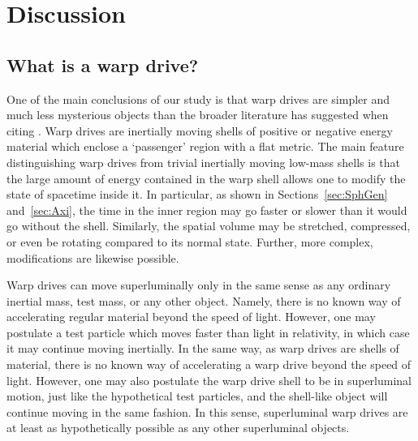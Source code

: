 \documentclass[10pt]{iopart}
\begin{document}






\section{Discussion}
\label{sec:Disc}

\subsection{What is a warp drive?}

One of the main conclusions of our study is that warp drives are simpler and much less mysterious objects than the broader literature has suggested when citing \cite{Alcubierre1994}. Warp drives are inertially moving shells of positive or negative energy material which enclose a `passenger' region with a flat metric. The main feature distinguishing warp drives from trivial inertially moving low-mass shells is that the large amount of energy contained in the warp shell allows one to modify the state of spacetime inside it. In particular, as shown in Sections~\ref{sec:SphGen} and~\ref{sec:Axi}, the time in the inner region may go faster or slower than it would go without the shell. Similarly, the spatial volume may be stretched, compressed, or even be rotating compared to its normal state. Further, more complex, modifications are likewise possible.

Warp drives can move superluminally only in the same sense as any ordinary inertial mass, test mass, or any other object. Namely, there is no known way of accelerating regular material beyond the speed of light. However, one may postulate a test particle which moves faster than light in relativity, in which case it may continue moving inertially. In the same way, as warp drives are shells of material, there is no known way of accelerating a warp drive beyond the speed of light. However, one may also postulate the warp drive shell to be in superluminal motion, just like the hypothetical test particles, and the shell-like object will continue moving in the same fashion. In this sense, superluminal warp drives are at least as hypothetically possible as any other superluminal objects.
\end{document}
